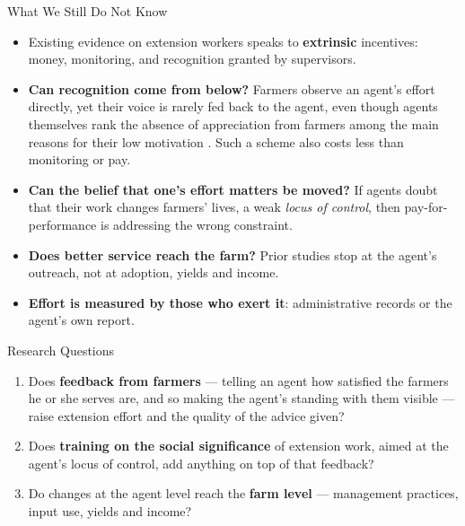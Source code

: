 \documentclass[aspectratio=169]{beamer}
\begin{document}
\begin{frame}{What We Still Do Not Know}
	\begin{itemize}\small
		\item Existing evidence on extension workers speaks to \textbf{extrinsic} incentives: money, monitoring, and recognition granted by supervisors.

		\vspace{0.18cm}
		\item \textbf{Can recognition come from below?} Farmers observe an agent's effort
		directly, yet their voice is rarely fed back to the agent, even though agents
		themselves rank the absence of appreciation
		from farmers among the main reasons for their low motivation \citep{ragasa_assessment_2013}. Such a scheme also costs less than monitoring or pay.

		\vspace{0.18cm}
		\item \textbf{Can the belief that one's effort matters be moved?} If agents doubt that
		their work changes farmers' lives, a weak \emph{locus of control}, then
		pay-for-performance is addressing the wrong constraint.

		\vspace{0.18cm}
		\item \textbf{Does better service reach the farm?} Prior studies stop at the agent's
		outreach, not at adoption, yields and income.

		\vspace{0.18cm}
		\item \textbf{Effort is measured by those who exert it}: administrative records or the
		agent's own report.
	\end{itemize}
\end{frame}

\begin{frame}{Research Questions}
	\begin{enumerate}
		\item Does \textbf{feedback from farmers} --- telling an agent how satisfied the farmers
		he or she serves are, and so making the agent's standing with them visible --- raise
		extension effort and the quality of the advice given?

		\vspace{0.35cm}
		\item Does \textbf{training on the social significance} of extension work, aimed at the
		agent's locus of control, add anything on top of that feedback?

		\vspace{0.35cm}
		\item Do changes at the agent level reach the \textbf{farm level} --- management
		practices, input use, yields and income?
	\end{enumerate}
\end{frame}
\end{document}

